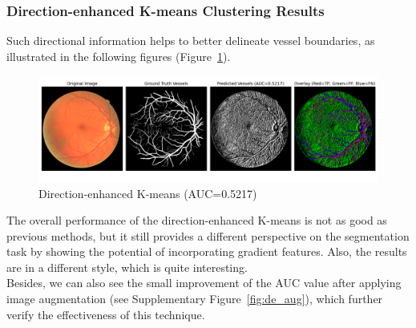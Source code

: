 \documentclass[final]{article}
\begin{document}
\subsubsection{Direction-enhanced K-means Clustering Results}
Such directional information helps to better delineate vessel boundaries, as illustrated in the following figures (Figure~\ref{fig:de}).
\begin{figure}[H]
    \centering
    \includegraphics[scale=0.25]{Figures/5 Directed (Merge 3 Clusters).png}
    \vspace{-0.25cm}
    \caption{Direction-enhanced K-means (AUC=0.5217)}
    \label{fig:de}
\end{figure}
The overall performance of the direction-enhanced K-means is not as good as previous methods, but it still provides a different perspective on the segmentation task by showing the potential of incorporating gradient features. Also, the results are in a different style, which is quite interesting. \\
Besides, we can also see the small improvement of the AUC value after applying image augmentation (see Supplementary Figure~\ref{fig:de_aug}), which further verify the effectiveness of this technique. 
\end{document}

